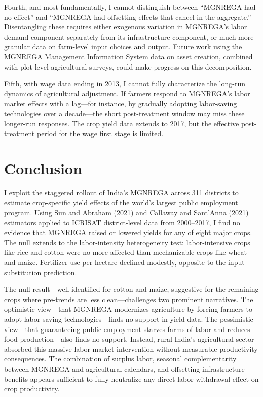 \documentclass[12pt]{article}
\begin{document}
Fourth, and most fundamentally, I cannot distinguish between ``MGNREGA had no effect'' and ``MGNREGA had offsetting effects that cancel in the aggregate.'' Disentangling these requires either exogenous variation in MGNREGA's labor demand component separately from its infrastructure component, or much more granular data on farm-level input choices and output. Future work using the MGNREGA Management Information System data on asset creation, combined with plot-level agricultural surveys, could make progress on this decomposition.

Fifth, with wage data ending in 2013, I cannot fully characterize the long-run dynamics of agricultural adjustment. If farmers respond to MGNREGA's labor market effects with a lag---for instance, by gradually adopting labor-saving technologies over a decade---the short post-treatment window may miss these longer-run responses. The crop yield data extends to 2017, but the effective post-treatment period for the wage first stage is limited.

\section{Conclusion}

I exploit the staggered rollout of India's MGNREGA across 311 districts to estimate crop-specific yield effects of the world's largest public employment program. Using Sun and Abraham (2021) and Callaway and Sant'Anna (2021) estimators applied to ICRISAT district-level data from 2000--2017, I find no evidence that MGNREGA raised or lowered yields for any of eight major crops. The null extends to the labor-intensity heterogeneity test: labor-intensive crops like rice and cotton were no more affected than mechanizable crops like wheat and maize. Fertilizer use per hectare declined modestly, opposite to the input substitution prediction.

The null result---well-identified for cotton and maize, suggestive for the remaining crops where pre-trends are less clean---challenges two prominent narratives. The optimistic view---that MGNREGA modernizes agriculture by forcing farmers to adopt labor-saving technologies---finds no support in yield data. The pessimistic view---that guaranteeing public employment starves farms of labor and reduces food production---also finds no support. Instead, rural India's agricultural sector absorbed this massive labor market intervention without measurable productivity consequences. The combination of surplus labor, seasonal complementarity between MGNREGA and agricultural calendars, and offsetting infrastructure benefits appears sufficient to fully neutralize any direct labor withdrawal effect on crop productivity.
\end{document}
